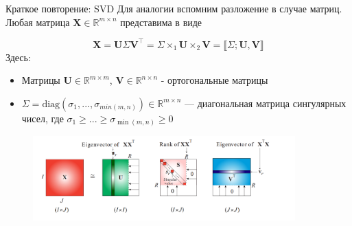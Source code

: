 
\usepackage{tikz}
\usepackage{amsmath}
\usepackage[english,russian]{babel}
\usepackage[labelformat=empty]{caption}

\usepackage{graphicx,animate}
\usepackage{animate}
\usepackage{svg}
\usepackage{subcaption}

\usepackage{ stmaryrd }

\usetikzlibrary{arrows,shapes,positioning,shadows,trees}
\newcommand*{\defeq}{\stackrel{\text{def}}{=}}
\newcommand{\tensor}[1]{\underline{\textbf{#1}}}
\newcommand{\M}[1]{\textbf{#1}}
\newcommand{\norm}[1]{\lVert #1 \rVert }

\begin{frame}[plain]
\titlepage
\end{frame}
\begin{frame}{Краткое повторение: SVD}
Для аналогии вспомним разложение в случае матриц.\\
Любая матрица $\M{X} \in \mathbb{R}^{m \times n}$ представима в виде

$$ \M{X}
    = \M{U} \Sigma \M{V}^{\intercal}
    = \Sigma \times_1 \M{U} \times_2 \M{V}
    = \llbracket \Sigma; \M{U}, \M{V}\rrbracket
$$
Здесь:
\begin{itemize}
    \item Матрицы $\M{U} \in \mathbb{R}^{m \times m}$, $\M{V} \in \mathbb{R}^{n \times n}$ - ортогональные матрицы
    \item $ \Sigma = \text{diag}(\sigma_1,...,\sigma_{min(m,n)}) \in  \mathbb{R}^{m \times n}$ --- диагональная матрица сингулярных чисел,
    где $\sigma_1\geq ... \geq \sigma_{\min (m,n)}\geq 0$
\end{itemize}
\begin{figure}
    \centering
    \includegraphics[width=0.9\textwidth]{lecture_12/figs/SVD.png}
\end{figure}
\end{frame}


